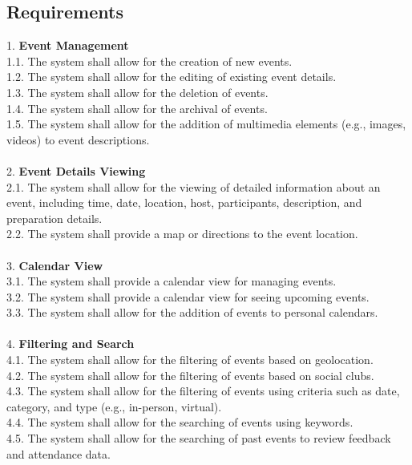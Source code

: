 \documentclass[a4paper,12pt]{article}
\begin{document}
\subsection{Requirements}

1. \textbf{Event Management}\\
    1.1. The system shall allow for the creation of new events.\\
    1.2. The system shall allow for the editing of existing event details.\\
    1.3. The system shall allow for the deletion of events.\\
    1.4. The system shall allow for the archival of events.\\
    1.5. The system shall allow for the addition of multimedia elements (e.g., images, videos) to event descriptions.\\\\
2. \textbf{Event Details Viewing}\\
    2.1. The system shall allow for the viewing of detailed information about an event, including time, date, 
    location, host, participants, description, and preparation details.\\
    2.2. The system shall provide a map or directions to the event location.\\\\
3. \textbf{Calendar View}\\
    3.1. The system shall provide a calendar view for managing events.\\
    3.2. The system shall provide a calendar view for seeing upcoming events.\\
    3.3. The system shall allow for the addition of events to personal calendars.\\\\
4. \textbf{Filtering and Search}\\
    4.1. The system shall allow for the filtering of events based on geolocation.\\
    4.2. The system shall allow for the filtering of events based on social clubs.\\
    4.3. The system shall allow for the filtering of events using criteria such as date, category, and type (e.g., in-person, virtual).\\
    4.4. The system shall allow for the searching of events using keywords.\\
    4.5. The system shall allow for the searching of past events to review feedback and attendance data.\\\\
\end{document}
